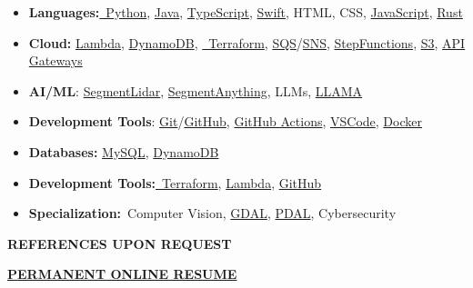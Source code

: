 \begin{itemize}
\item
  \textbf{Languages:}\href{https://www.python.org/}{~Python},
  \href{https://www.java.com/en/}{Java},
  \href{https://www.typescriptlang.org/}{TypeScript},
  \href{https://www.swift.org/}{Swift}, HTML, CSS,
  \href{https://www.javascript.com/}{JavaScript},
  \href{https://rustlings.rust-lang.org/}{Rust}
\item
  \textbf{Cloud:}
  \href{https://aws.amazon.com/pm/lambda/?gclid=CjwKCAiAiOa9BhBqEiwABCdG8_-jcsK9i3KVP2t5NgupDXinpyF36M-7OgfzGPhJI0F8zaahD0sMmBoC8NIQAvD_BwE\&trk=e0e0d4be-47fe-4336-ab69-7eece7f3d36e\&sc_channel=ps\&ef_id=CjwKCAiAiOa9BhBqEiwABCdG8_-jcsK9i3KVP2t5NgupDXinpyF36M-7OgfzGPhJI0F8zaahD0sMmBoC8NIQAvD_BwE:G:s\&s_kwcid=AL!4422!3!652240143523!e!!g!!amazon\%20lambda!19878797032!147151597893}{Lambda},
  \href{https://aws.amazon.com/dynamodb/}{DynamoDB},
  \href{https://developer.hashicorp.com/terraform/language}{~Terraform},
  \href{https://aws.amazon.com/sqs/}{SQS}/\href{https://aws.amazon.com/sns/}{SNS},
  \href{https://aws.amazon.com/step-functions/}{StepFunctions},
  \href{https://aws.amazon.com/s3/}{S3},
  \href{https://aws.amazon.com/api-gateway/}{API Gateways}
\item
  \textbf{AI/ML}:
  \href{https://github.com/Yarroudh/segment-lidar}{SegmentLidar},
  \href{https://segment-anything.com/}{SegmentAnything}, LLMs,
  \href{https://www.llama.com/}{LLAMA}
\item
  \textbf{Development Tools}:
  \href{https://git-scm.com/}{Git}/\href{https://github.com/}{GitHub},
  \href{https://github.com/TomTheTonk/Resume/actions}{GitHub Actions},
  \href{https://code.visualstudio.com/}{VSCode},
  \href{https://www.docker.com}{Docker}
\item
  \textbf{Databases:} \href{https://www.mysql.com/}{MySQL},
  \href{https://aws.amazon.com/dynamodb/}{DynamoDB}
\item
  \textbf{Development
  Tools:}\href{https://developer.hashicorp.com/terraform/language}{~Terraform},
  \href{https://aws.amazon.com/pm/lambda/?gclid=CjwKCAiAiOa9BhBqEiwABCdG8_-jcsK9i3KVP2t5NgupDXinpyF36M-7OgfzGPhJI0F8zaahD0sMmBoC8NIQAvD_BwE\&trk=e0e0d4be-47fe-4336-ab69-7eece7f3d36e\&sc_channel=ps\&ef_id=CjwKCAiAiOa9BhBqEiwABCdG8_-jcsK9i3KVP2t5NgupDXinpyF36M-7OgfzGPhJI0F8zaahD0sMmBoC8NIQAvD_BwE:G:s\&s_kwcid=AL!4422!3!652240143523!e!!g!!amazon\%20lambda!19878797032!147151597893}{Lambda},
  \href{https://github.com/}{GitHub}
\item
  \textbf{Specialization:}~Computer Vision,
  \href{https://gdal.org/en/stable/}{GDAL},
  \href{https://pdal.io/en/2.8.4/}{PDAL}, Cybersecurity
\end{itemize}

\textbf{REFERENCES UPON REQUEST}

\href{http://github.com/TomTheTonk/Resume}{\textbf{PERMANENT ONLINE
RESUME}}
